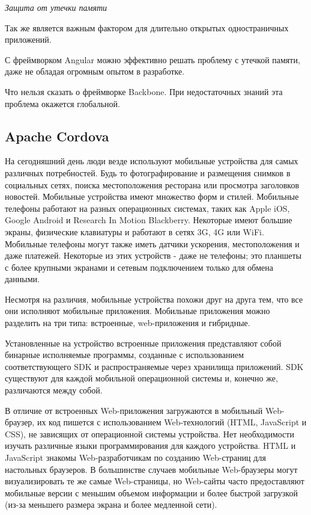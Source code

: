 {\itshape Защита от утечки памяти} 

Так же является важным фактором для длительно открытых одностраничных приложений.

С фреймворком Angular можно эффективно решать проблему с утечкой памяти, даже не обладая огромным опытом в разработке.

Что нельзя сказать о фреймворке Backbone. При недостаточных знаний эта проблема окажется глобальной.

\subsection{Apache Cordova}
На сегодняшний день люди везде используют мобильные устройства для самых различных потребностей. Будь то фотографирование и размещения снимков в социальных сетях, поиска местоположения ресторана или просмотра заголовков новостей. Мобильные устройства имеют множество форм и стилей. Мобильные телефоны работают на разных операционных системах, таких как Apple iOS, Google Android и Research In Motion Blackberry. Некоторые имеют большие экраны, физические клавиатуры и работают в сетях 3G, 4G или WiFi. Мобильные телефоны могут также иметь датчики ускорения, местоположения и даже платежей. Некоторые из этих устройств - даже не телефоны; это планшеты с более крупными экранами и сетевым подключением только для обмена данными.

Несмотря на различия, мобильные устройства похожи друг на друга тем, что все они исполняют мобильные приложения. Мобильные приложения можно разделить на три типа: встроенные, web-приложения и гибридные.

Установленные на устройство встроенные приложения представляют собой бинарные исполняемые программы, созданные с использованием соответствующего  SDK  и  распространяемые  через  хранилища приложений. SDK существуют для каждой мобильной операционной системы и, конечно же, различаются между собой.

В отличие от встроенных Web-приложения загружаются в мобильный Web-браузер, их код пишется с использованием Web-технологий (HTML, JavaScript и CSS), не зависящих от операционной системы устройства. Нет необходимости изучать различные языки программирования для каждого устройства. HTML и JavaScript знакомы Web-разработчикам по созданию Web-страниц для настольных браузеров. В большинстве случаев мобильные Web-браузеры могут визуализировать те же самые Web-страницы, но Web-сайты часто предоставляют мобильные версии с меньшим объемом информации и более быстрой загрузкой (из-за меньшего размера экрана и более медленной сети).

